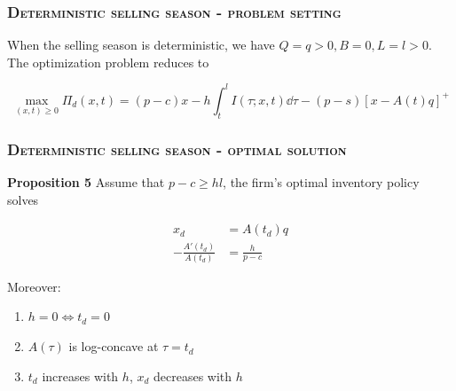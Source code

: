 \documentclass[aspectratio=169]{../presentation}
\begin{document}
    \begin{frame}
        \frametitle{\textsc{Deterministic selling season - problem setting}}

        When the selling season is deterministic, we have $Q = q > 0, B = 0, L = l > 0$. The optimization problem reduces to 

        \begin{equation}
            \max_{(x, t)\geq 0}\Pi_d(x, t) = (p-c)x - h\int_t^l I(\tau; x, t)\dd \tau - (p - s)\left[x - A(t)q\right]^+
            \label{eq:7}
        \end{equation}

    \end{frame}

    \begin{frame}
        \frametitle{\textsc{Deterministic selling season - optimal solution}}

        \textrm{\bfseries Proposition 5} Assume that $p - c \geq hl$, the firm's optimal inventory policy solves

        \begin{align}
            x_d &= A\left(t_d\right)q \\
            -\frac{A'\left(t_d\right)}{A\left(t_d\right)} &= \frac{h}{p-c}
        \end{align}

        Moreover:

        \begin{enumerate}
            \item $h = 0\Leftrightarrow t_d = 0$
            \item $A(\tau)$ is log-concave at $\tau = t_d$
            \item $t_d$ increases with $h$, $x_d$ decreases with $h$
        \end{enumerate}

    \end{frame}
\end{document}
